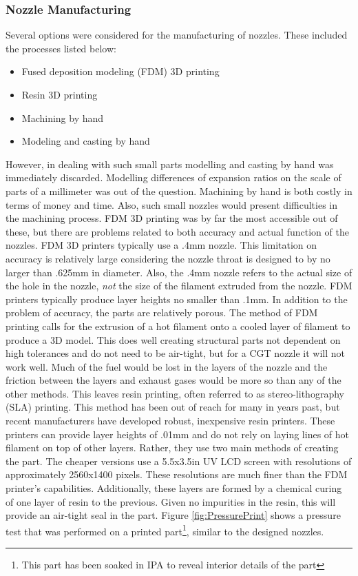 \subsubsection{Nozzle Manufacturing}
Several options were considered for the manufacturing of nozzles. These included the processes listed below:
\begin{itemize}
\item Fused deposition modeling (FDM) 3D printing
\item Resin 3D printing
\item Machining by hand
\item Modeling and casting by hand
\end{itemize}
However, in dealing with such small parts modelling and casting by hand was immediately discarded. Modelling differences of expansion ratios on the scale of parts of a millimeter was out of the question. Machining by hand is both costly in terms of money and time. Also, such small nozzles would present difficulties in the machining process. FDM 3D printing was by far the most accessible out of these, but there are problems related to both accuracy and actual function of the nozzles. FDM 3D printers typically use a .4mm nozzle. This limitation on accuracy is relatively large considering the nozzle throat is designed to by no larger than .625mm in diameter. Also, the .4mm nozzle refers to the actual size of the hole in the nozzle, \textit{not} the size of the filament extruded from the nozzle. FDM printers typically produce layer heights no smaller than .1mm. In addition to the problem of accuracy, the parts are relatively porous. The method of FDM printing calls for the extrusion of a hot filament onto a cooled layer of filament to produce a 3D model. This does well creating structural parts not dependent on high tolerances and do not need to be air-tight, but for a CGT nozzle it will not work well. Much of the fuel would be lost in the layers of the nozzle and the friction between the layers and exhaust gases would be more so than any of the other methods. This leaves resin printing, often referred to as stereo-lithography (SLA) printing. This method has been out of reach for many in years past, but recent manufacturers have developed robust, inexpensive resin printers. These printers can provide layer heights of .01mm and do not rely on laying lines of hot filament on top of other layers. Rather, they use two main methods of creating the part. The cheaper versions use a 5.5x3.5in UV LCD screen with resolutions of approximately 2560x1400 pixels. These resolutions are much finer than the FDM printer's capabilities. Additionally, these layers are formed by a chemical curing of one layer of resin to the previous. Given no impurities in the resin, this will provide an air-tight seal in the part. Figure \ref{fig:PressurePrint} shows a pressure test that was performed on a printed part\footnote{This part has been soaked in IPA to reveal interior details of the part}, similar to the designed nozzles.
